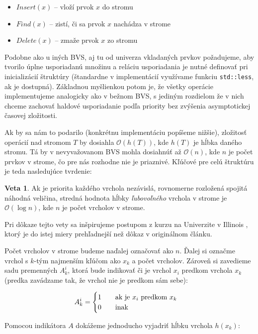 \documentclass[a4paper, 12pt]{article}
\theoremstyle{definition}
\newtheorem{veta}{Veta}
\begin{document}
\begin{itemize}
    \item $Insert(x)$ -- vloží prvok $x$ do stromu
    \item $Find(x)$ -- zistí, či sa prvok $x$ nachádza v strome
    \item $Delete(x)$ -- zmaže prvok $x$ zo stromu
\end{itemize}

Podobne ako u iných BVS, aj tu od univerza vkladaných prvkov požadujeme, aby
tvorilo úplne usporiadanú množinu a reláciu usporiadania je nutné definovať pri
inicializácií štruktúry (štandardne v implementácií využívame funkciu
\texttt{std::less}, ak je dostupná). Základnou myšlienkou potom je, že všetky
operácie implementujeme analogicky ako v bežnom BVS, s jediným rozdielom
že v nich chceme zachovať haldové usporiadanie podľa priority bez zvýšenia
asymptotickej časovej zložitosti.

Ak by sa nám to podarilo (konkrétnu implementáciu popíšeme nižšie), zložitosť
operácií nad stromom $T$ by dosiahla $\mathcal{O}(h(T))$, kde $h(T)$ je hĺbka
daného stromu. Tá by v nevyvažovanom BVS mohla dosiahnúť až
$\mathcal{O}(n)$,
kde $n$ je počet prvkov v strome, čo pre nás rozhodne nie je priaznivé. Kľúčové
pre celú štruktúru je teda nasledujúce tvrdenie:

\begin{veta}
    Ak je priorita každého vrchola nezávislá, rovnomerne rozložená spojitá
    náhodná veličina, stredná hodnota hĺbky \emph{ľubovoľného} vrchola v strome
    je $\mathcal{O}(\log n)$, kde $n$ je počet vrcholov v strome.
\end{veta}

Pri dôkaze tejto vety sa inšpirujeme postupom z kurzu na Univerzite v Illinois
\cite{erickson},
ktorý je do istej miery prehľadnejší než dôkaz v originálnom článku. 

Počet vrcholov v strome budeme naďalej označovať ako $n$. Ďalej si označme
vrchol s $k$-tým najmenším kľúčom ako $x_k$ a počet vrcholov. Zároveň si
zavedieme sadu premenných $A^i_k$, ktorá bude indikovať či je vrchol $x_i$
predkom vrchola $x_k$ (predka zavádzame tak, že vrchol nie je predkom sám
sebe):

$$
A_k^i = 
\begin{cases}
    \text{$1$\qquad ak je $x_i$ predkom $x_k$} \\
    \text{$0$\qquad inak}
\end{cases}
$$

Pomocou indikátora $A$ dokážeme jednoducho vyjadriť hĺbku vrchola $h(x_k)$:
\end{document}
